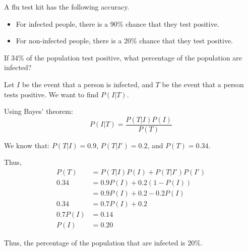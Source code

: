 \documentclass[a4paper, 10pt]{article}
\begin{document}
\begin{problem}
A flu test kit has the following accuracy.
\begin{itemize}[wide=0pt, itemsep=2pt, parsep=0pt, leftmargin=*]
	\item For infected people, there is a 90\% chance that they test positive.
	\item For non-infected people, there is a 20\% chance that they test positive.
\end{itemize}
If 34\% of the population test positive, what percentage of the population are infected?
\end{problem}

\begin{solution}
	Let \( I \) be the event that a person is infected, and \( T \) be the event that a person tests positive.
	We want to find \( P(I | T) \).

	\myspace

	Using Bayes' theorem:
	\[
		P(I | T) = \frac{P(T | I) P(I)}{P(T)}
	\]

	We know that: \( P(T | I) = 0.9 \), \( P(T | I') = 0.2 \), and \( P(T) = 0.34 \).

	\myspace

	Thus,
	\begin{align*}
		P(T)    & = P(T | I) P(I) + P(T | I') P(I') \\
		0.34    & = 0.9P(I) + 0.2(1 - P(I))         \\
		        & = 0.9P(I) + 0.2 - 0.2P(I)         \\
		0.34    & = 0.7P(I) + 0.2                   \\
		0.7P(I) & = 0.14                            \\
		P(I)    & = 0.20
	\end{align*}

	Thus, the percentage of the population that are infected is \( \boxed{20\%} \).
\end{solution}
\end{document}
